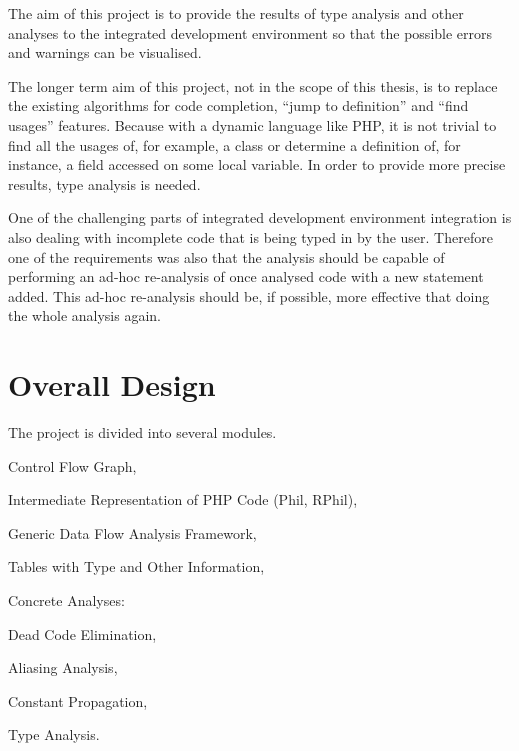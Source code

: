     The aim of this project is to provide the results of type analysis 
    and other analyses to the integrated development environment so 
    that the possible errors and warnings can be visualised.
    
    The longer term aim of this project, not in the scope of this thesis, 
    is to replace the existing algorithms for code completion, 
    ``jump to definition'' and ``find usages'' features. Because 
    with a dynamic language like PHP, it is not trivial to 
    find all the usages of, for example, a class or determine 
    a definition of, for instance, a field accessed on some local variable. 
    In order to provide more precise results, 
    type analysis is needed.
    
    One of the challenging parts of integrated development 
    environment integration is also dealing with incomplete code 
    that is being typed in by the user. Therefore one of the requirements 
    was also that the analysis should be capable of 
    performing an ad-hoc re-analysis of once analysed 
    code with a new statement added. This ad-hoc re-analysis 
    should be, if possible, more effective that doing the 
    whole analysis again.
    
    \section{Overall Design}
    
    The project is divided into several modules.
    \begin{itemize*}
        \item Control Flow Graph,
        \item Intermediate Representation of PHP Code (Phil, RPhil),
        \item Generic Data Flow Analysis Framework, 
        \item Tables with Type and Other Information, 
        \item Concrete Analyses:
        \begin{itemize*}
            \item Dead Code Elimination, 
            \item Aliasing Analysis, 
            \item Constant Propagation,
            \item Type Analysis.
        \end{itemize*}
    \end{itemize*}
    
